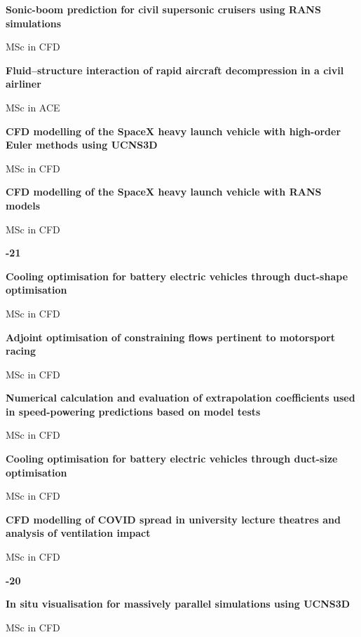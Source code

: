 \documentclass[11pt,a4paper]{article}
\newlength{\cventrysep}
\newenvironment{cventry}{%
  \par\noindent\begin{minipage}{\linewidth}
  \RaggedRight\fontsize{9.8}{12.5}\selectfont
}{\end{minipage}\par\addvspace{\cventrysep}}
\newcommand{\cvtitle}[1]{{\bfseries #1\par}\vspace{1pt}}
\newcommand{\cvmeta}[1]{{\fontsize{9}{11.5}\selectfont\color{Muted}#1\par}\vspace{1pt}}
\newcommand{\cvyear}[1]{{\color{Teal}\bfseries\fontsize{11}{13}\selectfont #1\par}\vspace{6pt}}
\begin{document}
\begin{cventry}
\cvtitle{Sonic-boom prediction for civil supersonic cruisers using RANS simulations}
\cvmeta{MSc in CFD}
\end{cventry}

\begin{cventry}
\cvtitle{Fluid--structure interaction of rapid aircraft decompression in a civil airliner}
\cvmeta{MSc in ACE}
\end{cventry}

\begin{cventry}
\cvtitle{CFD modelling of the SpaceX heavy launch vehicle with high-order Euler methods using UCNS3D}
\cvmeta{MSc in CFD}
\end{cventry}

\begin{cventry}
\cvtitle{CFD modelling of the SpaceX heavy launch vehicle with RANS models}
\cvmeta{MSc in CFD}
\end{cventry}

\begin{cventry}
\cvyear{2020-21}
\cvtitle{Cooling optimisation for battery electric vehicles through duct-shape optimisation}
\cvmeta{MSc in CFD}
\end{cventry}

\begin{cventry}
\cvtitle{Adjoint optimisation of constraining flows pertinent to motorsport racing}
\cvmeta{MSc in CFD}
\end{cventry}

\begin{cventry}
\cvtitle{Numerical calculation and evaluation of extrapolation coefficients used in speed-powering predictions based on model tests}
\cvmeta{MSc in CFD}
\end{cventry}

\begin{cventry}
\cvtitle{Cooling optimisation for battery electric vehicles through duct-size optimisation}
\cvmeta{MSc in CFD}
\end{cventry}

\begin{cventry}
\cvtitle{CFD modelling of COVID spread in university lecture theatres and analysis of ventilation impact}
\cvmeta{MSc in CFD}
\end{cventry}

\begin{cventry}
\cvyear{2019-20}
\cvtitle{In situ visualisation for massively parallel simulations using UCNS3D}
\cvmeta{MSc in CFD}
\end{cventry}
\end{document}
